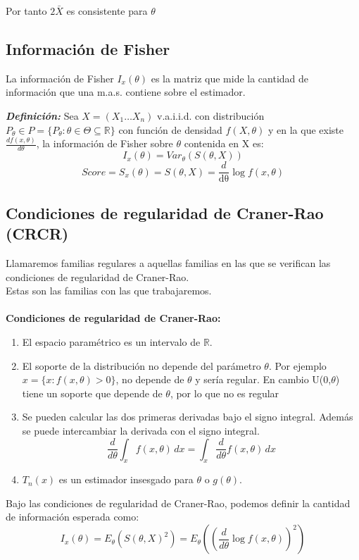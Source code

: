 Por tanto $2 \bar{X}$ es consistente para $\theta$

\newpage

\subsection{Información de Fisher}

La información de Fisher $I_x(\theta)$ es la matriz que mide la cantidad
de información que una m.a.s. contiene sobre el estimador.

\textbf{\textit{Definición: }} Sea $X=(X_1 \dots X_n)$ v.a.i.i.d. con distribución $P_\theta \in P=\{P_\theta : \theta \in \Theta \subseteq \mathbb{R}\}$ con función de densidad $f(X,\theta)$ y en la que existe $\frac{d f(x,\theta)}{d \theta}$, la información de Fisher sobre $\theta$ contenida en X es:
\[
    I_x(\theta) = Var_\theta (S(\theta,X))
\]
\[
    Score=S_x(\theta)=S(\theta,X)=\frac{d}{\mathrm{d\theta}}\log f(x,\theta)
\]
\subsection{Condiciones de regularidad de Craner-Rao (CRCR)}

Llamaremos familias regulares a aquellas familias en las que se verifican las 
condiciones de regularidad de Craner-Rao.
\\ Estas son las familias con las que trabajaremos.
\\ \\\textbf{Condiciones de regularidad de Craner-Rao:}
\begin{enumerate}
    \item El espacio paramétrico es un intervalo de $\mathbb{R}$.
    \item El soporte de la distribución no depende del parámetro $\theta$.
    Por ejemplo $x=\{x:f(x,\theta) > 0 \}$, no depende de $\theta$ y sería regular. En cambio U(0,$\theta$) 
    tiene un soporte que depende de $\theta$, por lo que no es regular
    \item Se pueden calcular las dos primeras derivadas bajo el signo integral.
     Además se puede intercambiar la derivada con el signo integral.
    \[
        \frac{d}{d \theta} \int_{x} f(x,\theta)  \,dx = \int_{x} \frac{d}{d \theta} f(x,\theta)  \,dx
    \]
    \item $T_n(x)$ es un estimador insesgado para $\theta$ o $g(\theta)$.
\end{enumerate}

Bajo las condiciones de regularidad de Craner-Rao, podemos definir la cantidad
de información esperada como:
\[
    I_x(\theta)=E_\theta(S(\theta,X)^2)=E_\theta\left(\left(\frac{d}{d \theta} \log f(x,\theta)\right)^2\right)
\]

